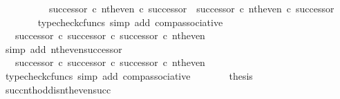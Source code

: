 \begin{isabellebody}
\ \ \isamarkupfalse%
\ {\isacharminus}{\kern0pt}\isanewline
\ \ \ \ \isamarkupfalse%
\ {\isachardoublequoteopen}{\isacharparenleft}{\kern0pt}successor\ {\isasymcirc}\isactrlsub c\ nth{\isacharunderscore}{\kern0pt}even{\isacharparenright}{\kern0pt}\ {\isasymcirc}\isactrlsub c\ successor\ {\isacharequal}{\kern0pt}\ successor\ {\isasymcirc}\isactrlsub c\ nth{\isacharunderscore}{\kern0pt}even\ {\isasymcirc}\isactrlsub c\ successor{\isachardoublequoteclose}\isanewline
\ \ \ \ \ \ \isamarkupfalse%
\ {\isacharparenleft}{\kern0pt}typecheck{\isacharunderscore}{\kern0pt}cfuncs{\isacharcomma}{\kern0pt}\ simp\ add{\isacharcolon}{\kern0pt}\ comp{\isacharunderscore}{\kern0pt}associative{}{\isacharparenright}{\kern0pt}\isanewline
\ \ \ \ \isamarkupfalse%
\ \isamarkupfalse%
\ {\isachardoublequoteopen}{\isachardot}{\kern0pt}{\isachardot}{\kern0pt}{\isachardot}{\kern0pt}\ {\isacharequal}{\kern0pt}\ successor\ {\isasymcirc}\isactrlsub c\ successor\ {\isasymcirc}\isactrlsub c\ successor\ {\isasymcirc}\isactrlsub c\ nth{\isacharunderscore}{\kern0pt}even{\isachardoublequoteclose}\isanewline
\ \ \ \ \ \ \isamarkupfalse%
\ {\isacharparenleft}{\kern0pt}simp\ add{\isacharcolon}{\kern0pt}\ nth{\isacharunderscore}{\kern0pt}even{\isacharunderscore}{\kern0pt}successor{}{\isacharparenright}{\kern0pt}\isanewline
\ \ \ \ \isamarkupfalse%
\ \isamarkupfalse%
\ {\isachardoublequoteopen}{\isachardot}{\kern0pt}{\isachardot}{\kern0pt}{\isachardot}{\kern0pt}\ {\isacharequal}{\kern0pt}\ {\isacharparenleft}{\kern0pt}successor\ {\isasymcirc}\isactrlsub c\ successor{\isacharparenright}{\kern0pt}\ {\isasymcirc}\isactrlsub c\ successor\ {\isasymcirc}\isactrlsub c\ nth{\isacharunderscore}{\kern0pt}even{\isachardoublequoteclose}\isanewline
\ \ \ \ \ \ \isamarkupfalse%
\ {\isacharparenleft}{\kern0pt}typecheck{\isacharunderscore}{\kern0pt}cfuncs{\isacharcomma}{\kern0pt}\ simp\ add{\isacharcolon}{\kern0pt}\ comp{\isacharunderscore}{\kern0pt}associative{}{\isacharparenright}{\kern0pt}\isanewline
\ \ \ \ \isamarkupfalse%
\ \isamarkupfalse%
\ {\isacharquery}{\kern0pt}thesis\isacommand{{\isachardot}{\kern0pt}}\isamarkupfalse%
\isanewline
\ \ \isamarkupfalse%
\isanewline
{}\isamarkupfalse%
%
\endisatagproof
{\isafoldproof}%
%
\isadelimproof
\isanewline
%
\endisadelimproof
\isanewline
{}\isamarkupfalse%
\ succ{\isacharunderscore}{\kern0pt}nth{\isacharunderscore}{\kern0pt}odd{\isacharunderscore}{\kern0pt}is{\isacharunderscore}{\kern0pt}nth{\isacharunderscore}{\kern0pt}even{\isacharunderscore}{\kern0pt}succ{\isacharcolon}{\kern0pt}\isanewline

\end{isabellebody}

